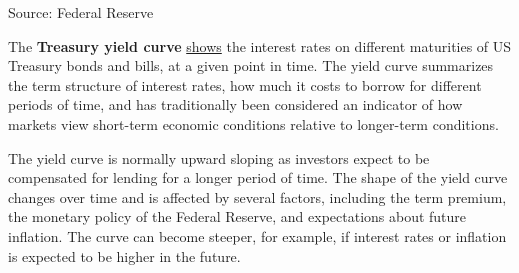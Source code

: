 \documentclass{report}
\begin{document}
{\begin{minipage}{0.76\textwidth}
\vspace{-2mm}		
\footnotesize{Source: Federal Reserve}
\end{minipage}
\newpage
\begin{minipage}{0.76\textwidth}
\small The \textbf{Treasury yield curve} \href{https://www.treasury.gov/resource-center/data-chart-center/interest-rates/Pages/TextView.aspx?data=yield}{shows} the interest rates on different maturities of US Treasury bonds and bills, at a given point in time. The yield curve summarizes the term structure of interest rates, how much it costs to borrow for different periods of time, and has traditionally been considered an indicator of how markets view short-term economic conditions relative to longer-term conditions. 

The yield curve is normally upward sloping as investors expect to be compensated for lending for a longer period of time. The shape of the yield curve changes over time and is affected by several factors, including the term premium, the monetary policy of the Federal Reserve, and expectations about future inflation. The curve can become steeper, for example, if interest rates or inflation is expected to be higher in the future. 
\end{minipage}
\vspace{1mm}

}
\end{document}
